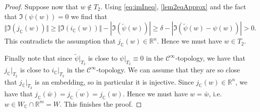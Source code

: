 \documentclass{amsart}
\theoremstyle{plain}
\theoremstyle{definition}
\theoremstyle{remark}
\numberwithin{equation}{thm} %
\newcommand{\R}{\mathbb{R}}
\newcommand{\C}{\mathbb{C}}
\begin{document}
\begin{proof}
Suppose now that $w\not\in T_2$. Using \eqref{eq:imIneq}, \eqref{lem2eqApprox} and the fact that $\Im(\psi(w))=0$ we find that
\begin{equation*}
    \Vert \Im(j_\C(w))\Vert\geq \Vert \Im(i_\C(w))\Vert-| \Im(\tilde \psi(w))|\geq \delta -| \Im(\tilde \psi(w)-\psi(w))|>0.
\end{equation*}
This contradicts the assumption that $j_\C(w)\in \R^n$. Hence we must have $w\in T_2$.

Finally note that since $\tilde \psi\vert_{T_2}$ is close to $\psi\vert_{T_2}\equiv 0$ in the $\mathcal C^\infty$-topology, we have that $j_\C\vert_{T_2}$ is close to $i_\C\vert_{T_2}$ in the $\mathcal C^\infty$-topology. We can assume that they are so close that $j_\C\vert_{T_2}$ is an embedding, so in particular it is injective. Since $j_\C(w)\in \R^n$, we have that $j_\C(\bar w)=\overline{j_\C(w)}=j_\C(w)$. Hence we must have $w=\bar w$, i.e. $w\in W_\C\cap \R^m=W$. This finishes the proof.
\end{proof}
\end{document}
